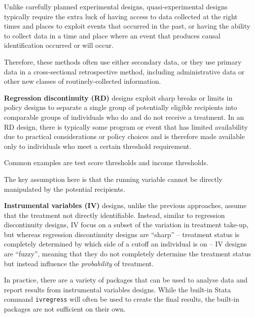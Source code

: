 Unlike carefully planned experimental designs,
quasi-experimental designs typically require the extra luck
of having access to data collected at the right times and places
to exploit events that occurred in the past,
or having the ability to collect data in a time and place
where an event that produces causal identification occurred or will occur.

Therefore, these methods often use either secondary data,
or they use primary data in a cross-sectional retrospective method,
including administrative data or other new classes of routinely-collected information.


\textbf{Regression discontinuity (RD)} designs exploit sharp breaks or limits
in policy designs to separate a single group of potentially eligible recipients
into comparable groups of individuals who do and do not receive a treatment. 
In an RD design, there is typically some program or event
that has limited availability due to practical considerations or policy choices
and is therefore made available only to individuals who meet a certain threshold requirement.

Common examples are test score thresholds and income thresholds.

The key assumption here is that the running variable cannot be directly manipulated
by the potential recipients.


\textbf{Instrumental variables (IV)} designs, unlike the previous approaches,
assume that the treatment not directly identifiable.
Instead, similar to regression discontinuity designs,
IV focus on a subset of the variation in treatment take-up, 
but whereas regression discontinuity designs are ``sharp'' --
treatment status is completely determined by which side of a cutoff an individual is on --
IV designs are ``fuzzy'', meaning that they do not completely determine
the treatment status but instead influence the \textit{probability} of treatment.

In practice, there are a variety of packages that can be used
to analyse data and report results from instrumental variables designs.
While the built-in Stata command \texttt{ivregress} will often be used
to create the final results, the built-in packages are not sufficient on their own.

